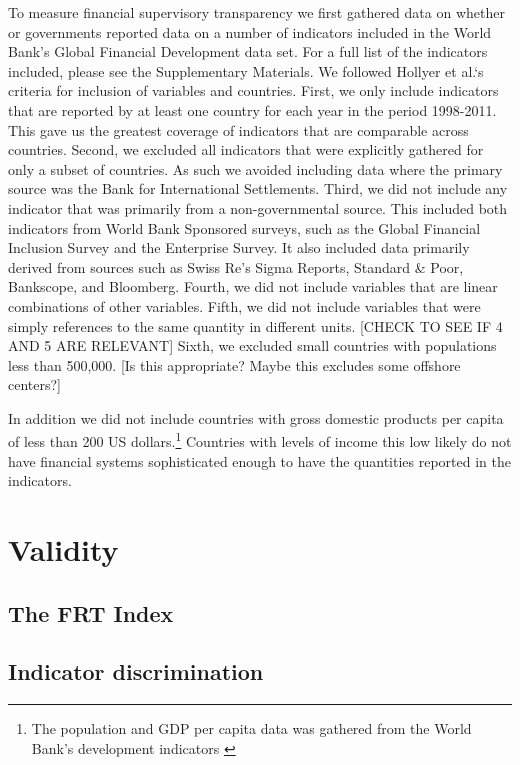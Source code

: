 \documentclass[a4paper]{article}
\begin{document}
To measure financial supervisory transparency we first gathered data on whether or governments reported data on a number of indicators included in the World Bank's Global Financial Development data set. For a full list of the indicators included, please see the Supplementary Materials. We followed Hollyer et al.`s \citeyearpar{Hollyer2014} criteria for inclusion of variables and countries. First, we only include indicators that are reported by at least one country for each year in the period 1998-2011. This gave us the greatest coverage of indicators that are comparable across countries. Second, we excluded all indicators that were explicitly gathered for only a subset of countries. As such we avoided including data where the primary source was the Bank for International Settlements. Third, we did not include any indicator that was primarily from a non-governmental source. This included both indicators from World Bank Sponsored surveys, such as the Global Financial Inclusion Survey and the Enterprise Survey. It also included data primarily derived from sources such as Swiss Re's Sigma Reports, Standard \& Poor, Bankscope, and Bloomberg. Fourth, we did not include variables that are linear combinations of other variables. Fifth, we did not include variables that were simply references to the same quantity in different units. [CHECK TO SEE IF 4 AND 5 ARE RELEVANT] Sixth, we excluded small countries with populations less than 500,000. [Is this appropriate? Maybe this excludes some offshore centers?] 

In addition we did not include countries with gross domestic products per capita of less than 200 US dollars.\footnote{The population and GDP per capita data was gathered from the World Bank's development indicators \citeyearpar{WDIMain}} Countries with levels of income this low likely do not have financial systems sophisticated enough to have the quantities reported in the indicators. 

\section{Validity}

\subsection{The FRT Index}

\subsection{Indicator discrimination}
\end{document}
